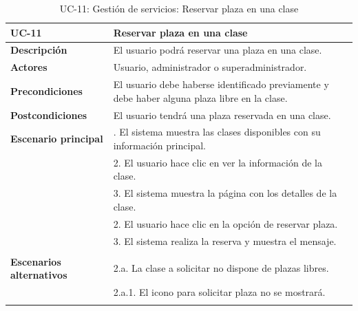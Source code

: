 \begin{table}[H]
  \begin{center}
    \begin{tabularx}{16.4cm}{|l|X|}
      \hline
      \textbf{UC-11} & \textbf{Reservar plaza en una clase}\\
      \hline
      \textbf{Descripción} & El usuario podrá reservar una plaza en una clase.\\
      \hline
      \textbf{Actores} & Usuario, administrador o superadministrador.\\
      \hline
      \textbf{Precondiciones} & El usuario debe haberse identificado previamente y debe haber alguna plaza libre en la clase.\\
      \hline
      \textbf{Postcondiciones} & El usuario tendrá una plaza reservada en una clase.\\
      \hline
      \textbf{Escenario principal} & \smallskip 1. El sistema muestra las clases disponibles con su información principal.\\
      & 2. El usuario hace clic en ver la información de la clase.\\
      & 3. El sistema muestra la página con los detalles de la clase.\\
      & 2. El usuario hace clic en la opción de reservar plaza.\\
      & 3. El sistema realiza la reserva y muestra el mensaje.\\
      & \\
      \hline
      \textbf{Escenarios alternativos} & \smallskip 2.a. La clase a solicitar no dispone de plazas libres.\\
      & \hspace{0.3cm} 2.a.1. El icono para solicitar plaza no se mostrará. \\
      & \\
      \hline
    \end{tabularx}
    \caption{UC-11: Gestión de servicios: Reservar plaza en una clase}
    \label{tab:CU-reservar-clase}
  \end{center}
\end{table}



